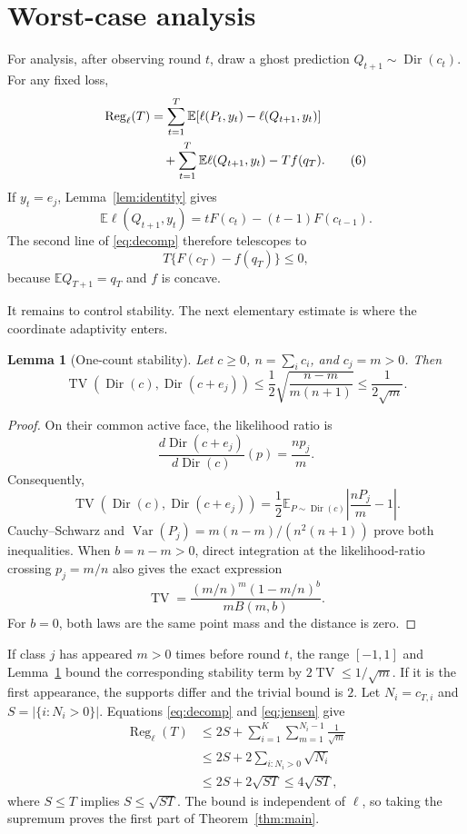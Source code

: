 \documentclass{article}
\newtheorem{lemma}[theorem]{Lemma}
\theoremstyle{definition}
\theoremstyle{remark}
\newcommand{\E}{\mathbb E}
\newcommand{\Dir}{\operatorname{Dir}}
\newcommand{\TV}{\operatorname{TV}}
\newcommand{\Reg}{\operatorname{Reg}}
\begin{document}
\section{Worst-case analysis}\label{sec:worst}

For analysis, after observing round $t$, draw a ghost prediction $Q_{t+1}\sim\Dir(c_t)$.  For any fixed loss,
\begin{align}
 \Reg_\ell(T)
 &=\sum_{t=1}^T\E[\ell(P_t,y_t)-\ell(Q_{t+1},y_t)] \notag\\
 &\quad+\sum_{t=1}^T\E\ell(Q_{t+1},y_t)-Tf(q_T).  \tag{6}\label{eq:decomp}
\end{align}
If $y_t=e_j$, Lemma~\ref{lem:identity} gives \[ \E\ell(Q_{t+1},y_t)=tF(c_t)-(t-1)F(c_{t-1}). \] The second line of \eqref{eq:decomp} therefore telescopes to \[ T\{F(c_T)-f(q_T)\}\leq0,                     \tag{7}\label{eq:jensen} \] because $\E Q_{T+1}=q_T$ and $f$ is concave.

It remains to control stability.  The next elementary estimate is where the coordinate adaptivity enters.

\begin{lemma}[One-count stability]\label{lem:tv}
Let $c\geq0$, $n=\sum_i c_i$, and $c_j=m>0$.  Then \[ \TV(\Dir(c),\Dir(c+e_j)) \leq\frac12\sqrt{\frac{n-m}{m(n+1)}} \leq\frac1{2\sqrt m}. \]
\end{lemma}

\begin{proof}
On their common active face, the likelihood ratio is \[ \frac{d\Dir(c+e_j)}{d\Dir(c)}(p)=\frac{np_j}{m}. \] Consequently, \[ \TV(\Dir(c),\Dir(c+e_j)) =\frac12\E_{P\sim\Dir(c)}\left|\frac{nP_j}{m}-1\right|. \] Cauchy--Schwarz and $\operatorname{Var}(P_j)=m(n-m)/(n^2(n+1))$ prove both inequalities. When $b=n-m>0$, direct integration at the likelihood-ratio crossing $p_j=m/n$ also gives the exact expression \[ \TV=\frac{(m/n)^m(1-m/n)^b}{mB(m,b)}. \] For $b=0$, both laws are the same point mass and the distance is zero.
\end{proof}

If class $j$ has appeared $m>0$ times before round $t$, the range $[-1,1]$ and Lemma~\ref{lem:tv} bound the corresponding stability term by $2\TV\leq1/\sqrt m$.  If it is the first appearance, the supports differ and the trivial bound is $2$.  Let $N_i=c_{T,i}$ and $S=|\{i:N_i>0\}|$.  Equations \eqref{eq:decomp} and \eqref{eq:jensen} give
\begin{align*}
 \Reg_\ell(T)
 &\leq2S+\sum_{i=1}^K\sum_{m=1}^{N_i-1}\frac1{\sqrt m}\\
 &\leq2S+2\sum_{i:N_i>0}\sqrt{N_i}\\
 &\leq2S+2\sqrt{ST}\leq4\sqrt{ST},
\end{align*}
where $S\leq T$ implies $S\leq\sqrt{ST}$. The bound is independent of $\ell$, so taking the supremum proves the first part of Theorem~\ref{thm:main}.
\end{document}
